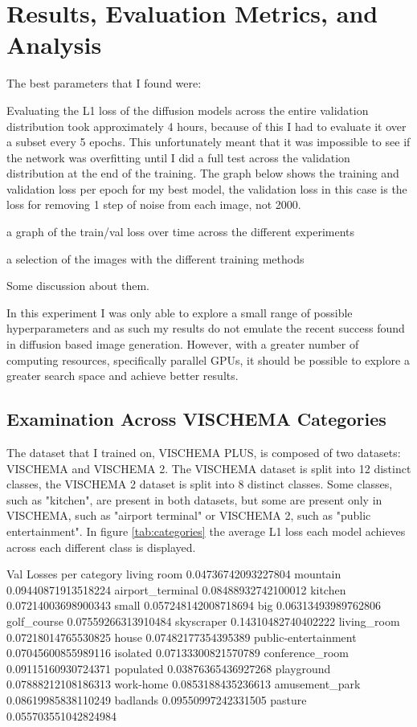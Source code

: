 \documentclass{UoYCSproject}
\begin{document}
\section{Results, Evaluation Metrics, and Analysis}

The best parameters that I found were: 

Evaluating the L1 loss of the diffusion models across the entire validation distribution took approximately 4 hours, because of this I had to evaluate it over a subset every 5 epochs. This unfortunately meant that it was impossible to see if the network was overfitting until I did a full test across the validation distribution at the end of the training. The graph below shows the training and validation loss per epoch for my best model, the validation loss in this case is the loss for removing 1 step of noise from each image, not 2000.

a graph of the train/val loss over time across the different experiments



a selection of the images with the different training methods


Some discussion about them.

In this experiment I was only able to explore a small range of possible hyperparameters and as such my results do not emulate the recent success found in diffusion based image generation. \cite{ramesh2022hierarchical, saharia2022photorealistic} However, with a greater number of computing resources, specifically parallel GPUs, it should be possible to explore a greater search space and achieve better results.

\subsection{Examination Across VISCHEMA Categories}

The dataset that I trained on, VISCHEMA PLUS, is composed of two datasets: VISCHEMA and VISCHEMA 2. The VISCHEMA dataset is split into 12 distinct classes, the VISCHEMA 2 dataset is split into 8 distinct classes. Some classes, such as "kitchen", are present in both datasets, but some are present only in VISCHEMA, such as "airport terminal" or VISCHEMA 2, such as "public entertainment". In figure \ref{tab:categories} the average L1 loss each model achieves across each different class is displayed.

Val Losses per category
living room 0.04736742093227804
mountain 0.09440871913518224
airport_terminal 0.08488932742100012
kitchen 0.07214003698900343
small 0.057248142008718694
big 0.06313493989762806
golf_course 0.07559266313910484
skyscraper 0.14310482740402222
living_room 0.07218014765530825
house 0.07482177354395389
public-entertainment 0.07045600855989116
isolated 0.07133300821570789
conference_room 0.09115160930724371
populated 0.03876365436927268
playground 0.07888212108186313
work-home 0.0853188435236613
amusement_park 0.08619985838110249
badlands 0.09550997242331505
pasture 0.055703551042824984
\end{document}
